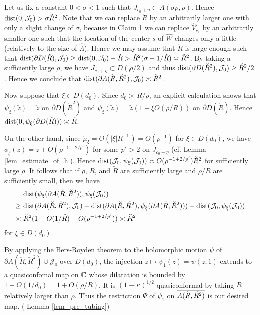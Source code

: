 Let us fix a constant $0<\sigma<1$ such that 
$J_{c_0+\eta} \subset A(\sigma \rho,\rho)$.
Hence $\dist(0, \mathcal{J}_0) > \sigma \check{R}^2$.
Note that we can replace $\check{R}$ by an arbitrarily larger one 
with only a slight change of $\sigma$, 
because in Claim 1 we can replace $\widehat{V}_{c_1}$ 
by an arbitrarily smaller one 
such that the location of the center $s$ of $\widehat{W}$
changes only a little (relatively to the size of $\widehat{\Lambda}$). 
Hence we may assume that $\check{R}$ is large enough such 
that
$\dist(\partial D(\check{R}), \mathcal{J}_0)
\ge \dist(0, \mathcal{J}_0) -\check{R}
> \check{R}^2(\sigma -1/\check{R})
 \asymp \check{R}^2$.
By taking a sufficiently large $\rho$, 
we have $J_{c_0+\eta} \subset D(\rho/2)$ 
and thus $\dist(\partial D(\check{R}^2), \mathcal{J}_0) \ge \check{R}^2/2$.
Hence we conclude that 
$\dist(\partial A(\check{R},\check{R}^2), \mathcal{J}_0) \asymp \check{R}^2$.

Now suppose that $\xi \in D(d_0)$.
Since $d_0 \asymp R/\rho$,
an explicit calculation shows that 
$\psi_\xi(\check{z})=\check{z}$ on $\partial D(\check{R}^2)$
and 
$\psi_\xi(\check{z})=\check{z}(1+\xi O(\rho/R))$
on $\partial D(\check{R})$.
Hence $\dist(0, \psi_\xi(\partial D(\check{R}))) \asymp \check{R}$.

On the other hand, 
since $\check{\mu}_\xi=O(|\xi| R^{-1}) =O(\rho^{-1})$ for $\xi \in D(d_0)$,
we have $\phi_\xi(z)=z+O(\rho^{-1+2/p'})$
 for some $p' >2$ on $J_{c_0+\eta}$
 (cf. Lemma \ref{lem_estimate_of_h}).
Hence 
$\dist(\mathcal{J}_0, \psi_\xi(\mathcal{J}_0)) 
\asymp O(\rho^{-1+2/p'}) \check{R}^2$ 
for sufficiently large $\rho$.
It follows that if $\rho$, $R$, and $\check{R}$ are sufficiently large
and $\rho/R$ are sufficiently small,
then we have 
\begin{align*}
&\dist(\psi_\xi(\partial A(\check{R},\check{R}^2)),
\psi_\xi(\mathcal{J}_0)) \\
\ge~ & 
\dist(\partial A(\check{R},\check{R}^2),
\mathcal{J}_0)
-\dist(\partial A(\check{R},\check{R}^2),
\psi_\xi(\partial A(\check{R},\check{R}^2)))
 -\dist(\mathcal{J}_0,  \psi_\xi(\mathcal{J}_0))\\
 \asymp~ 
 & \check{R}^2(1 - O(1/\check{R}) -O(\rho^{-1+2/p'})) 
\asymp \check{R}^2 
\end{align*}
for $\xi \in D(d_0)$.

By applying the Bers-Royden theorem
to the holomorphic motion $\psi$ of 
$\partial A(\check{R},\check{R}^2) \cup \mathcal{J}_0$
over $D(d_0)$,
the injection $z \mapsto \psi_1(z)=\psi(z,1)$
extends to a quasiconfomal map on $\C$
whose dilatation is bounded by $1+O(1/d_0)=1+O(\rho/R)$.
It is $(1+\kappa)^{1/2}$-quasiconformal 
 by taking $R$ relatively larger than $\rho$.
Thus the restriction $\Psi$ of $\psi_1$
on $\Bar{A(\check{R}, \check{R}^2)}$
is our desired map. 
\QED ( Lemma \ref{lem_pre_tubing})

